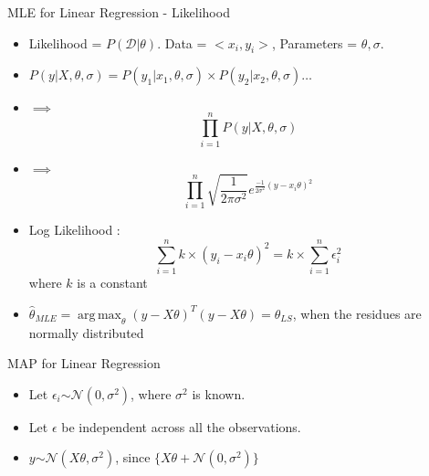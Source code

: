 \documentclass{beamer}
\DeclareMathOperator*{\argmax}{arg\,max}
\begin{document}
\begin{frame}{MLE for Linear Regression - Likelihood}
\begin{itemize}
\item Likelihood = $P(\mathcal{D}|\theta)$. Data = $<x_i, y_i>$, Parameters = $\theta, \sigma$.
\item $P(y | X, \theta, \sigma) = P(y_1 | x_1, \theta, \sigma) \times P(y_2 | x_2, \theta, \sigma) \dots$
\item $\implies$ \begin{equation*}
  \prod_{i=1}^{n} P(y | X, \theta, \sigma)
\end{equation*}
\item $\implies$ \begin{equation*}
    \prod_{i=1}^{n} \sqrt{\frac{1}{2 \pi \sigma^{2}}}e^{\frac{-1}{2\sigma^{2}}(y - x_i\theta)^{2}}
\end{equation*}
\item Log Likelihood : \begin{equation*}
    \sum_{i = 1}^{n} k \times (y_i - x_i\theta)^{2} = k \times \sum_{i=1}^{n}\epsilon_i^{2}
\end{equation*}
where $k$ is a constant

\item $\hat{\theta}_{MLE} = \argmax_\theta (y - X\theta)^{T}(y - X\theta) = \hat{\theta}_{LS}$, when the residues are normally distributed
\end{itemize}
\end{frame}

\begin{frame}{MAP for Linear Regression}

\begin{itemize}
    \item Let $\epsilon_i \stackrel{}{\sim} \mathcal{N}(0, \sigma^{2})$, where $\sigma^{2}$ is known.
    \item Let $\epsilon$ be independent across all the observations.
    \item $y \stackrel{}{\sim} \mathcal{N}(X\theta, \sigma^{2})$, since $\{ X\theta + \mathcal{N}(0, \sigma^{2})\}$ 

\end{itemize}
    
\end{frame}
\end{document}
